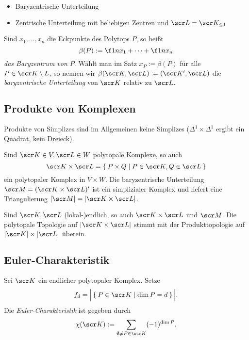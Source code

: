 \begin{ex}
	\begin{itemize}
		\item
			Baryzentrische Unterteilung
		\item
			Zentrische Unterteilung mit beliebigen Zentren und $\scr L = \scr K_{\le 1}$
	\end{itemize}
\end{ex}

\begin{df}
	Sind $x_1, \dotsc, x_n$ die Eckpunkte des Polytops $P$, so heißt
	\[
		\beta(P) := \f 1n x_1 + \dotsb + \f 1n x_n
	\]
	\emph{das Baryzentrum von $P$}.
	Wählt man im Satz %
	$x_P := \beta(P)$ für alle $P \in \scr K \setminus L$, so nennen wir $\beta(\scr K, \scr L) := (\scr K', \scr L)$ die \emph{baryzentrische Unterteilung} von $\scr K$ relativ zu $\scr L$.
\end{df}

\subsection{Produkte von Komplexen}

Produkte von Simplizes sind im Allgemeinen keine Simplizes ($\Delta^1 \times \Delta^1$ ergibt ein Quadrat, kein Dreieck).

\begin{st}
	Sind $\scr K \in V, \scr L \in W$ polytopale Komplexe, so auch
	\[
		\scr K \times \scr L = \Set{ P \times Q | P \in \scr K, Q \in \scr L }
	\]
	ein polytopaler Komplex in $V \times W$.
	Die baryzentrische Unterteilung $\scr M = (\scr K \times \scr L)'$ ist ein simplizialer Komplex und liefert eine Triangulierung $| \scr M| = | \scr K \times \scr L|$.

	Sind $\scr K, \scr L$ (lokal-)endlich, so auch $\scr K \times \scr L$ und $\scr M$.
	Die polytopale Topologie auf $|\scr K \times \scr L|$ stimmt mit der Produkttopologie auf $|\scr K| \times |\scr L|$ überein.
\end{st}

\subsection{Euler-Charakteristik}

\begin{df}
	Sei $\scr K$ ein endlicher polytopaler Komplex.
	Setze
	\[
		f_d = \Big| \Set{ P \in \scr K | \dim P = d } \Big|.
	\]
	Die \emph{Euler-Charakteristik} ist gegeben durch
	\[
		\chi(\scr K)
		:= \sum_{\emptyset \neq P \in \scr K}
		(-1)^{\dim P}.
	\]
\end{df}

